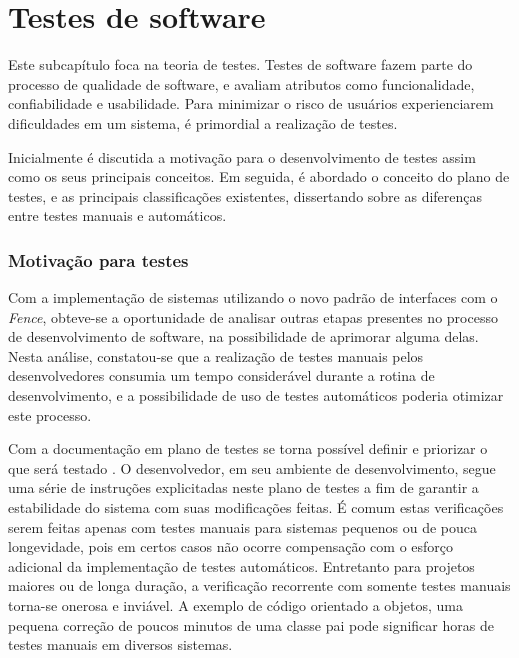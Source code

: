 \hypertarget{testes-de-software}{%
\section{Testes de software}\label{testes-de-software}}
Este subcapítulo foca na teoria de testes. Testes de software fazem parte do processo de qualidade de software, e avaliam atributos como funcionalidade, confiabilidade e usabilidade. Para minimizar o risco de usuários experienciarem dificuldades em um sistema, é primordial a realização de testes.

Inicialmente é discutida a motivação para o desenvolvimento de testes assim como os seus principais conceitos. Em seguida, é abordado o conceito do plano de testes, e as principais classificações existentes, dissertando sobre as diferenças entre testes manuais e automáticos.

\hypertarget{motivacao-para-testes}{%
\subsubsection{Motivação para testes}\label{motivacao-para-testes}}

Com a implementação de sistemas utilizando o novo padrão de interfaces com o \emph{Fence}, obteve-se a oportunidade de analisar outras etapas presentes no processo de desenvolvimento de software, na possibilidade de aprimorar alguma delas. Nesta análise, constatou-se que a realização de testes manuais pelos desenvolvedores consumia um tempo considerável durante a rotina de desenvolvimento, e a possibilidade de uso de testes automáticos poderia otimizar este processo.

Com a documentação em plano de testes se torna possível definir e priorizar o que será testado \cite{leung}. O desenvolvedor, em seu ambiente de desenvolvimento, segue uma série de instruções explicitadas neste plano de testes a fim de garantir a estabilidade do sistema com suas modificações feitas. É comum estas verificações serem feitas apenas com testes manuais para sistemas pequenos ou de pouca longevidade, pois em certos casos não ocorre compensação com o esforço adicional da implementação de testes automáticos. Entretanto para projetos maiores ou de longa duração, a verificação recorrente com somente testes manuais torna-se onerosa e inviável. A exemplo de código orientado a objetos, uma pequena correção de poucos minutos de uma classe pai pode significar horas de testes manuais em diversos sistemas.

